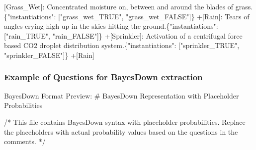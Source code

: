 \documentclass[
  11pt,
  letterpaper,
]{book}
\newenvironment{Shaded}{\begin{snugshade}}{\end{snugshade}}
\newcommand{\AnnotationTok}[1]{\textcolor[rgb]{0.37,0.37,0.37}{#1}}
\newcommand{\CommentTok}[1]{\textcolor[rgb]{0.37,0.37,0.37}{#1}}
\newcommand{\FunctionTok}[1]{\textcolor[rgb]{0.28,0.35,0.67}{#1}}
\newcommand{\NormalTok}[1]{\textcolor[rgb]{0.00,0.23,0.31}{#1}}
\newcommand{\OtherTok}[1]{\textcolor[rgb]{0.00,0.23,0.31}{#1}}
\begin{document}
\begin{landscape}
\begin{Shaded}
\begin{Highlighting}[]
\OtherTok{[Grass\_Wet]: }\NormalTok{Concentrated moisture on, between and around the blades of grass.\{"instantiations": }\CommentTok{[}\OtherTok{"grass\_wet\_TRUE", "grass\_wet\_FALSE"}\CommentTok{]}\NormalTok{\}    }
\NormalTok{    +}\CommentTok{[}\OtherTok{Rain}\CommentTok{]}\NormalTok{: Tears of angles crying high up in the skies hitting the ground.\{"instantiations": }\CommentTok{[}\OtherTok{"rain\_TRUE", "rain\_FALSE"}\CommentTok{]}\NormalTok{\}}
\NormalTok{    +}\CommentTok{[}\OtherTok{Sprinkler}\CommentTok{]}\NormalTok{: Activation of a centrifugal force based CO2 droplet distribution system.\{"instantiations": }\CommentTok{[}\OtherTok{"sprinkler\_TRUE", "sprinkler\_FALSE"}\CommentTok{]}\NormalTok{\}}
\NormalTok{        +}\CommentTok{[}\OtherTok{Rain}\CommentTok{]}
\end{Highlighting}
\end{Shaded}

\subsubsection*{Example of Questions for BayesDown
extraction}\label{example-of-questions-for-bayesdown-extraction}

\begin{Shaded}
\begin{Highlighting}[]
\AnnotationTok{BayesDown Format Preview:}
\FunctionTok{\# BayesDown Representation with Placeholder Probabilities}

\NormalTok{/* This file contains BayesDown syntax with placeholder probabilities.}
\NormalTok{   Replace the placeholders with actual probability values based on the }
\NormalTok{   questions in the comments. */}


\end{Highlighting}
\end{Shaded}
\end{landscape}
\end{document}
